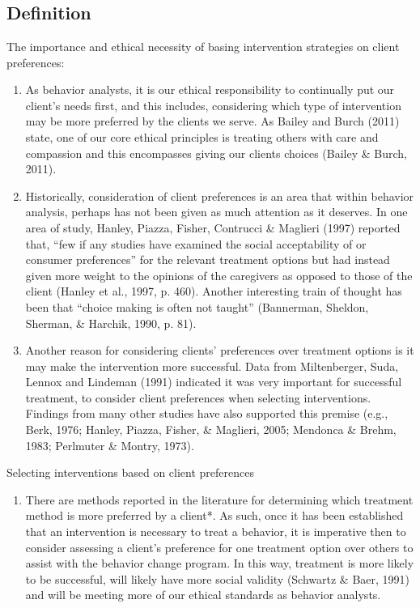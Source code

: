 \clearpage \section[\fourjFour{}]{\fourjFour{}%
              }
\subsection{Definition}
The importance and ethical necessity of basing intervention strategies on client preferences:
\begin{enumerate}
\item As behavior analysts, it is our ethical responsibility to continually put our client's needs first, and this includes, considering which type of intervention may be more preferred by the clients we serve. As Bailey and Burch (2011) state, one of our core ethical principles is treating others with care and compassion and this encompasses giving our clients choices (Bailey \& Burch, 2011).
%
\item Historically, consideration of client preferences is an area that within behavior analysis, perhaps has not been given as much attention as it deserves. In one area of study, Hanley, Piazza, Fisher, Contrucci \& Maglieri (1997) reported that, ``few if any studies have examined the social acceptability of or consumer preferences'' for the relevant treatment options but had instead given more weight to the opinions of the caregivers as opposed to those of the client (Hanley et al., 1997, p. 460). Another interesting train of thought has been that ``choice making is often not taught'' (Bannerman, Sheldon, Sherman, \& Harchik, 1990, p. 81).
%
\item Another reason for considering clients' preferences over treatment options is it may make the intervention more successful. Data from Miltenberger, Suda, Lennox and Lindeman (1991) indicated it was very important for successful treatment, to consider client preferences when selecting interventions. Findings from many other studies have also supported this premise (e.g., Berk, 1976; Hanley, Piazza, Fisher, \& Maglieri, 2005; Mendonca \& Brehm, 1983; Perlmuter \& Montry, 1973).
\end{enumerate}

Selecting interventions based on client preferences 
\begin{enumerate}
\item There are methods reported in the literature for determining which treatment method is more preferred by a client*. As such, once it has been established that an intervention is necessary to treat a behavior, it is imperative then to consider assessing a client's preference for one treatment option over others to assist with the behavior change program. In this way, treatment is more likely to be successful, will likely have more social validity (Schwartz \& Baer, 1991) and will be meeting more of our ethical standards as behavior analysts.
\end{enumerate}
%
